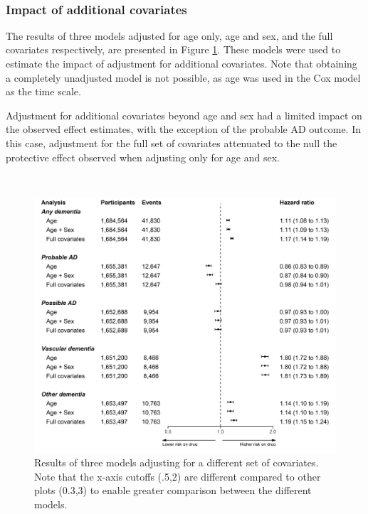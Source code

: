 \documentclass[a4paper, twoside]{templates/ociamthesis}
\begin{document}
~

\hypertarget{impact-of-additional-covariates-1}{%
\subsubsection{Impact of additional covariates}\label{impact-of-additional-covariates-1}}

The results of three models adjusted for age only, age and sex, and the full covariates respectively, are presented in Figure \ref{fig:unadjustedComparisonFig}. These models were used to estimate the impact of adjustment for additional covariates. Note that obtaining a completely unadjusted model is not possible, as age was used in the Cox model as the time scale.

Adjustment for additional covariates beyond age and sex had a limited impact on the observed effect estimates, with the exception of the probable AD outcome. In this case, adjustment for the full set of covariates attenuated to the null the protective effect observed when adjusting only for age and sex.

~





\begin{figure}[H]
\includegraphics[width=1\linewidth]{figures/cprd-analysis/forester_unadjusted} \caption[Comparison of different combinations of covariates]{Results of three models adjusting for a different set of covariates. Note that the x-axis cutoffs (.5,2) are different compared to other plots (0.3,3) to enable greater comparison between the different models.}\label{fig:unadjustedComparisonFig}
\end{figure}
\end{document}
